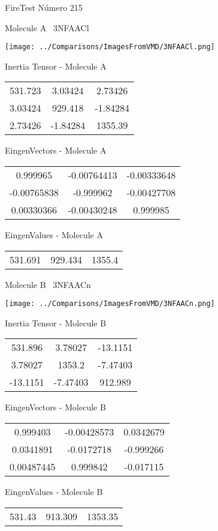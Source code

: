 \vtab[-3cm]
\begin{center}
{\large FireTest \tab Número 215}
\end{center}
\begin{multicols}{2}
\begin{center}

Molecule A \
3NFAACl

\texttt{[image: ../Comparisons/ImagesFromVMD/3NFAACl.png]}

Inertia Tensor - Molecule A \\
\begin{tabular}{|c c c|}
531.723	 & 	3.03424	 & 	2.73426	 \\
3.03424	 & 	929.418	 & 	-1.84284	 \\
2.73426	 & 	-1.84284	 & 	1355.39
\end{tabular}

\vtab
 EingenVectors - Molecule A     \\
\begin{tabular}{|c c c|}
0.999965	 & 	-0.00764413	 & 	-0.00333648	 \\
-0.00765838	 & 	-0.999962	 & 	-0.00427708	 \\
0.00330366	 & 	-0.00430248	 & 	0.999985
\end{tabular}

\vtab
 EingenValues - Molecule A     \\
\begin{tabular}{|c c c|}
531.691	 & 	929.434	 & 	1355.4	 \\
\end{tabular}
\columnbreak

Molecule B \
3NFAACn

\texttt{[image: ../Comparisons/ImagesFromVMD/3NFAACn.png]}

Inertia Tensor - Molecule B \\
\begin{tabular}{|c c c|}
531.896	 & 	3.78027	 & 	-13.1151	 \\
3.78027	 & 	1353.2	 & 	-7.47403	 \\
-13.1151	 & 	-7.47403	 & 	912.989
\end{tabular}

\vtab
 EingenVectors - Molecule B     \\
\begin{tabular}{|c c c|}
0.999403	 & 	-0.00428573	 & 	0.0342679	 \\
0.0341891	 & 	-0.0172718	 & 	-0.999266	 \\
0.00487445	 & 	0.999842	 & 	-0.017115
\end{tabular}

\vtab
 EingenValues - Molecule B     \\
\begin{tabular}{|c c c|}
531.43	 & 	913.309	 & 	1353.35	 \\
\end{tabular}

\end{center}
\end{multicols}

